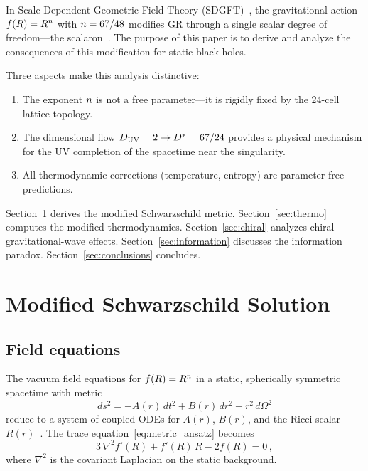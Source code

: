 \documentclass[amsmath,amssymb,aps,prd,twocolumn,superscriptaddress,nofootinbib]{revtex4-2}
\begin{document}
In Scale-Dependent Geometric Field Theory
(SDGFT)~\cite{Besemer_Paper01,Besemer_Paper04}, the gravitational
action $f(R) = R^{n}$ with $n = 67/48$ modifies GR through
a single scalar degree of freedom---the
scalaron~\cite{Besemer_Paper14,Besemer_Paper15}.  The purpose of
this paper is to derive and analyze the consequences of this
modification for static black holes.

Three aspects make this analysis distinctive:
\begin{enumerate}
  \item The exponent $n$ is not a free parameter---it is rigidly
    fixed by the 24-cell lattice topology.
  \item The dimensional flow $D_{\mathrm{UV}} = 2 \to D^{*} =
    67/24$ provides a physical mechanism for the UV completion of
    the spacetime near the singularity.
  \item All thermodynamic corrections (temperature, entropy) are
    parameter-free predictions.
\end{enumerate}

Section~\ref{sec:solution} derives the modified Schwarzschild
metric.  Section~\ref{sec:thermo} computes the modified
thermodynamics.  Section~\ref{sec:chiral} analyzes chiral
gravitational-wave effects.  Section~\ref{sec:information}
discusses the information paradox.
Section~\ref{sec:conclusions} concludes.

\section{Modified Schwarzschild Solution}
\label{sec:solution}

\subsection{Field equations}

The vacuum field equations for $f(R) = R^{n}$ in a static,
spherically symmetric spacetime with metric
\begin{equation}
  ds^2 = -A(r)\,dt^2 + B(r)\,dr^2 + r^2\,d\Omega^2
  \label{eq:metric_ansatz}
\end{equation}
reduce to a system of coupled ODEs for $A(r)$, $B(r)$, and the
Ricci scalar $R(r)$~\cite{Multamaki2006,delaCruzDombriz2009}.
The trace equation~\eqref{eq:metric_ansatz} becomes
\begin{equation}
  3\,\nabla^2 f'(R) + f'(R)\,R - 2f(R) = 0\,,
  \label{eq:trace_vacuum}
\end{equation}
where $\nabla^2$ is the covariant Laplacian on the static
background.
\end{document}
